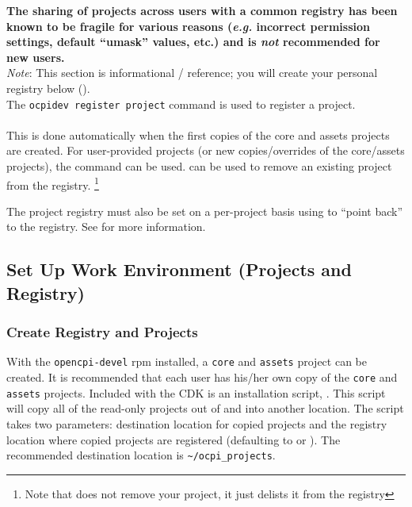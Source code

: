 \textbf{The sharing of projects across users with a common registry has been known to be fragile for various reasons (\textit{e.g.} incorrect permission settings, default ``umask'' values, etc.) and is \textit{not} recommended for new users.} \\

\textit{Note}: This section is informational / reference; you will create your personal registry below (). \\

The \verb+ocpidev register project+ command is used to register a project.\\
 \\
This is done automatically when the first copies of the core and assets projects are created.
For user-provided projects (or new copies/overrides of the core/assets projects), the  command can be used.
 can be used to remove an existing project from the registry.%
\footnote{Note that  does not remove your project, it just delists it from the registry}\\


The project registry must also be set on a per-project basis using  to ``point back'' to the registry. See  for more information.

\subsection{Set Up Work Environment (Projects and Registry)}
\subsubsection{Create Registry and Projects}
\label{sec:create_projects}
With the \texttt{opencpi-devel} rpm installed, a \texttt{core} and \texttt{assets} project can be created. It is recommended that each user has his/her own copy of the \texttt{core} and \texttt{assets} projects. Included with the CDK is an installation script, .
This script will copy all of the read-only projects out of  and into another location.
The script takes two parameters: destination location for copied projects and the registry location where copied projects are registered (defaulting to  or ). The recommended destination location is \verb+~/ocpi_projects+. \\

